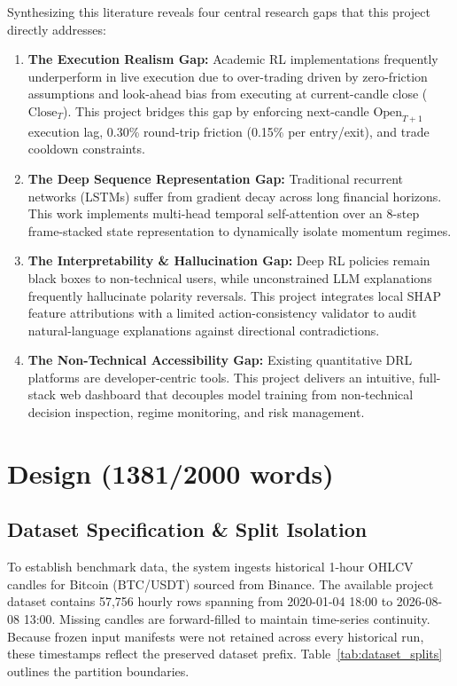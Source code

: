 \documentclass[11pt,a4paper]{article}
\begin{document}
Synthesizing this literature reveals four central research gaps that this project directly addresses:
\begin{enumerate}[leftmargin=2em]
    \item \textbf{The Execution Realism Gap:} Academic RL implementations frequently underperform in live execution due to over-trading driven by zero-friction assumptions and look-ahead bias from executing at current-candle close ($\text{Close}_T$). This project bridges this gap by enforcing next-candle $\text{Open}_{T+1}$ execution lag, 0.30\% round-trip friction (0.15\% per entry/exit), and trade cooldown constraints.
    \item \textbf{The Deep Sequence Representation Gap:} Traditional recurrent networks (LSTMs) suffer from gradient decay across long financial horizons. This work implements multi-head temporal self-attention over an 8-step frame-stacked state representation to dynamically isolate momentum regimes.
    \item \textbf{The Interpretability \& Hallucination Gap:} Deep RL policies remain black boxes to non-technical users, while unconstrained LLM explanations frequently hallucinate polarity reversals. This project integrates local SHAP feature attributions with a limited action-consistency validator to audit natural-language explanations against directional contradictions.
    \item \textbf{The Non-Technical Accessibility Gap:} Existing quantitative DRL platforms are developer-centric tools. This project delivers an intuitive, full-stack web dashboard that decouples model training from non-technical decision inspection, regime monitoring, and risk management.
\end{enumerate}

\section{Design (1381/2000 words)}

\subsection{Dataset Specification \& Split Isolation}
To establish benchmark data, the system ingests historical 1-hour OHLCV candles for Bitcoin (BTC/USDT) sourced from Binance. The available project dataset contains 57,756 hourly rows spanning from 2020-01-04 18:00 to 2026-08-08 13:00. Missing candles are forward-filled to maintain time-series continuity. Because frozen input manifests were not retained across every historical run, these timestamps reflect the preserved dataset prefix. Table~\ref{tab:dataset_splits} outlines the partition boundaries.
\end{document}
